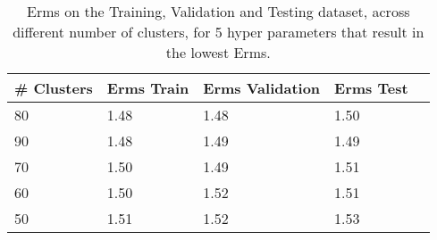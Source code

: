 \def\arraystretch{1.25}
\begin{table}[H]
\centering
\begin{tabular}{l l l l l}
\hline
\hline
\textbf{\# Clusters} & \textbf{Erms Train} & \textbf{Erms Validation} & \textbf{Erms Test}\\
\hline
\hline
80 & 1.48 & 1.48 & 1.50 \\
90 & 1.48 & 1.49 & 1.49 \\
70 & 1.50 & 1.49 & 1.51 \\
60 & 1.50 & 1.52 & 1.51 \\
50 & 1.51 & 1.52 & 1.53 \\
\hline
\end{tabular}
\caption{Erms on the Training, Validation and Testing dataset, across different number of clusters, for 5 hyper parameters that result in the lowest Erms.}
\end{table}
